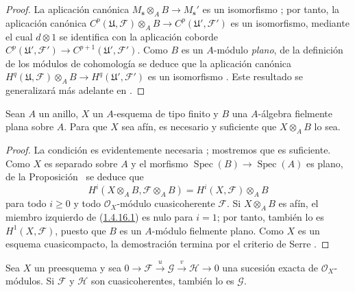 \begin{proof}
La aplicación canónica $M_{\mathbf s}\otimes_A B\to M_{\mathbf s}'$ es un isomorfismo ; por tanto, la aplicación canónica $C^p(\mathfrak U,\mathcal F)\otimes_A B\to
C^p(\mathfrak U',\mathcal F')$ es un isomorfismo, mediante el cual $d\otimes1$ se identifica con la aplicación coborde $C^p(\mathfrak U',\mathcal F')\to C^{p+1}(\mathfrak U',\mathcal F')$.
Como $B$ es un $A$-módulo \emph{plano}, de la definición de los módulos de cohomología se deduce que la aplicación canónica $H^q(\mathfrak U,\mathcal F)\otimes_A B\to
H^q(\mathfrak U',\mathcal F')$ es un isomorfismo .
Este resultado se generalizará más adelante en .
\end{proof}

\begin{corollary}[1.4.16]
\label{III.1.4.16}
\label{III.1.4.16-fr}
Sean $A$ un anillo, $X$ un $A$-esquema de tipo finito y $B$ una $A$-álgebra fielmente plana sobre $A$.
Para que $X$ sea afín, es necesario y suficiente que $X\otimes_A B$ lo sea.
\end{corollary}

\begin{proof}
La condición es evidentemente necesaria ; mostremos que es suficiente.
Como $X$ es separado sobre $A$ y el morfismo $\operatorname{Spec}(B)\to\operatorname{Spec}(A)$ es plano, de la Proposición~ se deduce que
\begin{equation}
\label{III.1.4.16.1-fr}
\tag{1.4.16.1}
H^i(X\otimes_A B,\mathcal F\otimes_A B)
=H^i(X,\mathcal F)\otimes_A B
\end{equation}
para todo $i\geq0$ y todo $\mathcal O_X$-módulo cuasicoherente $\mathcal F$.
Si $X\otimes_A B$ es afín, el miembro izquierdo de (\hyperref[III.1.4.16.1]{1.4.16.1}) es nulo para $i=1$; por tanto, también lo es $H^1(X,\mathcal F)$, puesto que $B$ es un $A$-módulo fielmente plano.
Como $X$ es un esquema cuasicompacto, la demostración termina por el criterio de Serre .
\end{proof}

\begin{proposition}[1.4.17]
\label{III.1.4.17}
\label{III.1.4.17-fr}
Sea $X$ un preesquema y sea $0\to\mathcal F\xrightarrow{u}\mathcal G\xrightarrow{v}\mathcal H\to0$ una sucesión exacta de $\mathcal O_X$-módulos.
Si $\mathcal F$ y $\mathcal H$ son cuasicoherentes, también lo es $\mathcal G$.
\end{proposition}

